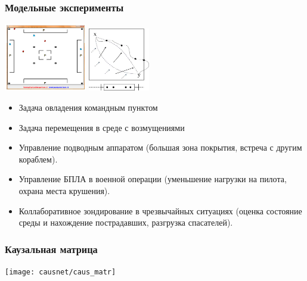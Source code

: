\documentclass[default]{beamer}
\begin{document}
	\begin{frame}
		\frametitle{Модельные эксперименты}
		
		\begin{center}
			\includegraphics[width=0.27\textwidth]{task1.png}
			\hspace*{30pt}
			\includegraphics[width=0.2\textwidth]{task2.jpg}
			
		\end{center}
		\begin{itemize}
			\item Задача овладения командным пунктом
			
			\item Задача перемещения в среде с возмущениями
			
			\item Управление подводным аппаратом (большая зона покрытия, встреча с другим кораблем).
			\item Управление БПЛА в военной операции (уменьшение нагрузки на пилота, охрана места крушения).
			\item Коллаборативное зондирование в чрезвычайных ситуациях (оценка состояние среды и нахождение пострадавших, разгрузка спасателей).
		\end{itemize}	
	\end{frame}	

	\begin{frame}
		\frametitle{Каузальная матрица}                             
		\centering
		\texttt{[image: causnet/caus\_matr]}
	\end{frame}	
\end{document}
